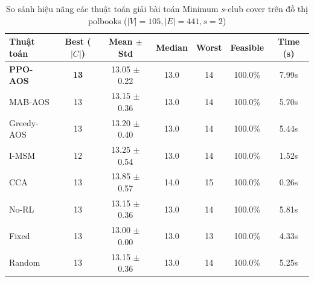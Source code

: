 \begin{table}[htbp]
\centering
\caption{So sánh hiệu năng các thuật toán giải bài toán Minimum $s$-club cover trên đồ thị polbooks ($|V|=105, |E|=441, s=2$)}
\label{tab:results_polbooks}
\begin{tabular}{lcccccc}
\hline
\textbf{Thuật toán} & \textbf{Best ($|C|$)} & \textbf{Mean $\pm$ Std} & \textbf{Median} & \textbf{Worst} & \textbf{Feasible} & \textbf{Time (s)} \\
\hline
\textbf{PPO-AOS} & \textbf{13} & 13.05 $\pm$ 0.22 & 13.0 & 14 & 100.0\% & 7.99s \\
MAB-AOS & 13 & 13.15 $\pm$ 0.36 & 13.0 & 14 & 100.0\% & 5.70s \\
Greedy-AOS & 13 & 13.20 $\pm$ 0.40 & 13.0 & 14 & 100.0\% & 5.44s \\
I-MSM & 12 & 13.25 $\pm$ 0.54 & 13.0 & 14 & 100.0\% & 1.52s \\
CCA & 13 & 13.85 $\pm$ 0.57 & 14.0 & 15 & 100.0\% & 0.26s \\
No-RL & 13 & 13.15 $\pm$ 0.36 & 13.0 & 14 & 100.0\% & 5.81s \\
Fixed & 13 & 13.00 $\pm$ 0.00 & 13.0 & 13 & 100.0\% & 4.33s \\
Random & 13 & 13.15 $\pm$ 0.36 & 13.0 & 14 & 100.0\% & 5.25s \\
\hline
\end{tabular}
\end{table}
